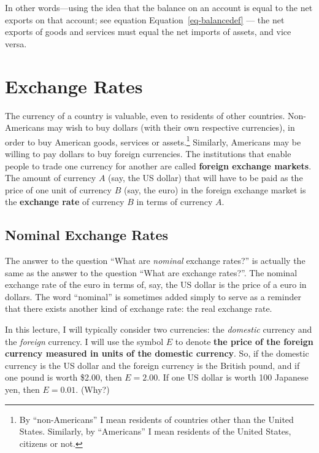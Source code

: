 \documentclass[
  letterpaper,
]{book}
\begin{document}
In other words---using the idea that the balance on an account is equal
to the net exports on that account; see equation
Equation~\ref{eq-balancedef} --- the net exports of goods and services
must equal the net imports of assets, and vice versa.


\chapter{Exchange Rates}\label{sec-exrates}

The currency of a country is valuable, even to residents of other
countries. Non-Americans may wish to buy dollars (with their own
respective currencies), in order to buy American goods, services or
assets.\footnote{By ``non-Americans'' I mean residents of countries
  other than the United States. Similarly, by ``Americans'' I mean
  residents of the United States, citizens or not.} Similarly, Americans
may be willing to pay dollars to buy foreign currencies. The
institutions that enable people to trade one currency for another are
called \textbf{foreign exchange
markets}. The amount of currency \(A\)
(say, the US dollar) that will have to be paid as the price of one unit
of currency \(B\) (say, the euro) in the foreign exchange market is the
\textbf{exchange rate} of currency \(B\) in terms
of currency \(A\).

\section{Nominal Exchange Rates}\label{sec-nomexrates}

The answer to the question ``What are \emph{nominal} exchange rates?''
is actually the same as the answer to the question ``What are exchange
rates?''. The nominal exchange
rate of the euro in terms of,
say, the US dollar is the price of a euro in dollars. The word
``nominal'' is sometimes added simply to serve as a reminder that there
exists another kind of exchange rate: the real exchange rate.

In this lecture, I will typically consider two currencies: the
\emph{domestic} currency and the \emph{foreign} currency. I will use the
symbol \(E\) to denote \textbf{the price of the foreign currency
measured in units of the domestic currency}. So, if the domestic
currency is the US dollar and the foreign currency is the British pound,
and if one pound is worth \$2.00, then \(E = 2.00\). If one US dollar is
worth 100 Japanese yen, then \(E=0.01\). (Why?)
\end{document}
